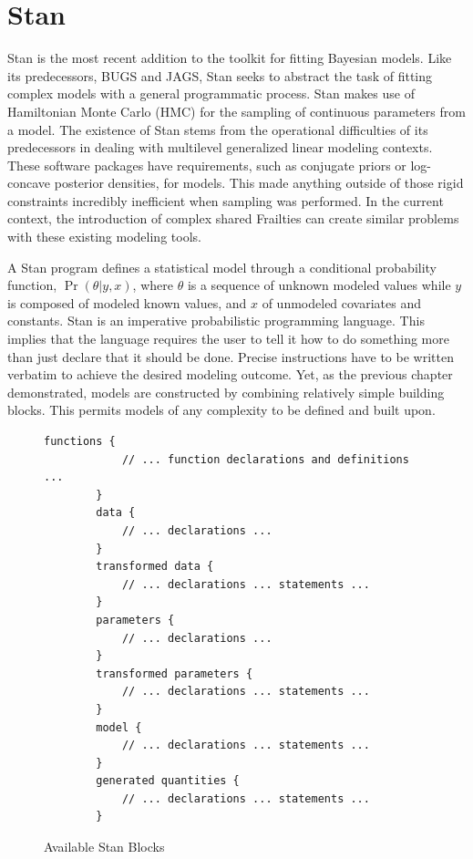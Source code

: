\section*{Stan}


Stan is the most recent addition to the toolkit for fitting Bayesian models. Like its predecessors, BUGS and JAGS, Stan seeks to abstract the task of fitting complex models with a general programmatic process. Stan makes use of Hamiltonian Monte Carlo (HMC) for the sampling of continuous parameters from a model. The existence of Stan stems from the operational difficulties of its predecessors in dealing with multilevel generalized linear modeling contexts. These software packages have requirements, such as conjugate priors or log-concave posterior densities, for models. This made anything outside of those rigid constraints incredibly inefficient when sampling was performed. In the current context, the introduction of complex shared Frailties can create similar problems with these existing modeling tools. 

A Stan program defines a statistical model through a conditional probability function, $\Pr(\theta|y,x)$, where $\theta$ is a sequence of unknown modeled values while $y$ is composed of modeled known values, and $x$ of unmodeled covariates and constants\cite{StanDevelopmentTeam2016}. Stan is an imperative probabilistic programming language. This implies that the language requires the user to tell it how to do something more than just declare that it should be done. Precise instructions have to be written verbatim to achieve the desired modeling outcome. Yet, as the previous chapter demonstrated, models are constructed by combining relatively simple building blocks. This permits models of any complexity to be defined and built upon.


\begin{figure}[htbp]
    \centering
    \begin{lstlisting}[belowskip=-2 \baselineskip]
        functions {
        	// ... function declarations and definitions ...
        }
        data {
        	// ... declarations ...
        }
        transformed data {
        	// ... declarations ... statements ...
        }
        parameters {
        	// ... declarations ...
        }
        transformed parameters {
        	// ... declarations ... statements ...
        }
        model {
        	// ... declarations ... statements ...
        }
        generated quantities {
        	// ... declarations ... statements ...
        }
    \end{lstlisting}
    \caption{Available Stan Blocks}
    \label{stanblocks}
\end{figure}


